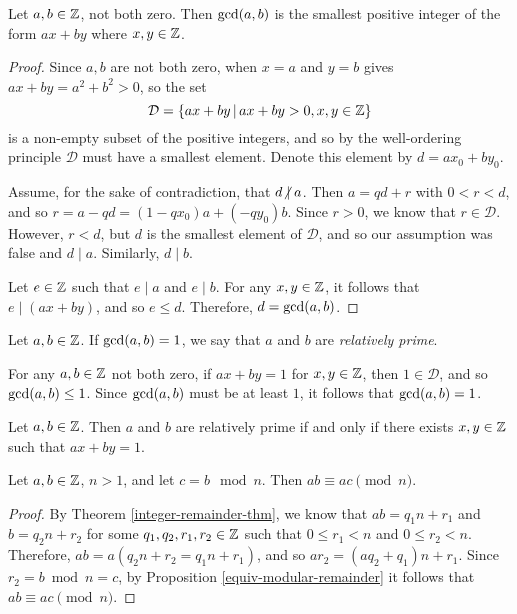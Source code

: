 \begin{thm}\label{gcd-characterization}
    Let $a, b \in \mathbb{Z}$, not both zero. Then $\operatorname{gcd}(a, b)$ is the smallest positive integer of the form $ax + by$ where $x, y \in \mathbb{Z}$.
\end{thm}

\begin{proof}
    Since $a, b$ are not both zero, when $x = a$ and $y = b$ gives $ax + by = a^2 + b^2 > 0$, so the set \[\mathcal{D} = \left\{ax+by \,\middle|\, ax + by > 0, x, y \in \mathbb{Z} \right\}\] is a non-empty subset of the positive integers, and so by the well-ordering principle $\mathcal{D}$ must have a smallest element. Denote this element by $d = ax_0 + by_0$.

    Assume, for the sake of contradiction, that $d \centernot\mid a$. Then $a = qd + r$ with $0 < r < d$, and so $r = a - qd = (1-qx_0)a + (-qy_0)b$. Since $r > 0$, we know that $r \in \mathcal{D}$. However, $r < d$, but $d$ is the smallest element of $\mathcal{D}$, and so our assumption was false and $d \mid a$. Similarly, $d \mid b$.

    Let $e \in \mathbb{Z}$ such that $e \mid a$ and $e \mid b$. For any $x, y \in \mathbb{Z}$, it follows that $e \mid (ax + by)$, and so $e \leq d$. Therefore, $d = \operatorname{gcd}(a, b)$.
\end{proof}

\begin{defn}
    Let $a, b \in \mathbb{Z}$. If $\operatorname{gcd}(a, b) = 1$, we say that $a$ and $b$ are \emph{relatively prime}.
\end{defn}

\begin{rmk}
    For any $a, b \in \mathbb{Z}$ not both zero, if $ax + by = 1$ for $x, y \in \mathbb{Z}$, then $1 \in \mathcal{D}$, and so $\operatorname{gcd}(a, b) \leq 1$. Since $\operatorname{gcd}(a, b)$ must be at least $1$, it follows that $\operatorname{gcd}(a, b) = 1$.
\end{rmk}

\begin{cor}\label{relatively-prime-linear-combination}
    Let $a, b \in \mathbb{Z}$. Then $a$ and $b$ are relatively prime if and only if there exists $x, y \in \mathbb{Z}$ such that $ax + by = 1$.
\end{cor}

\begin{lemma}\label{modular-product-identification}
    Let $a, b \in \mathbb{Z}$, $n > 1$, and let $c = b \mod n$. Then $ab \equiv ac \pmod n$.
\end{lemma}

\begin{proof}
    By Theorem \ref{integer-remainder-thm}, we know that $ab = q_1n + r_1$ and $b = q_2n + r_2$ for some $q_1, q_2, r_1, r_2 \in \mathbb{Z}$ such that $0 \leq r_1 < n$ and $0 \leq r_2 < n$. Therefore, $ab = a(q_2n + r_2 = q_1n + r_1)$, and so $ar_2 = (aq_2 + q_1)n + r_1$. Since $r_2 = b \bmod n = c$, by Proposition \ref{equiv-modular-remainder} it follows that $ab \equiv ac \pmod n$.
\end{proof}

